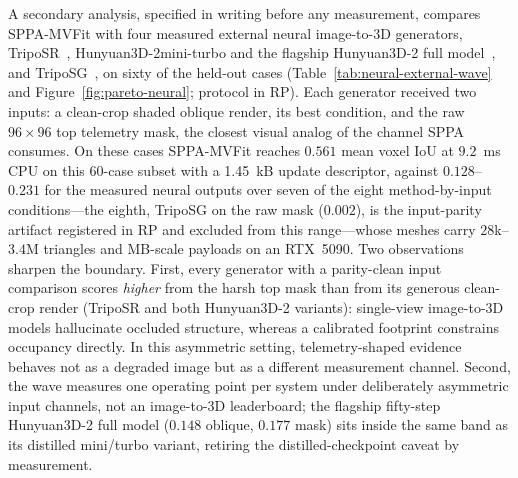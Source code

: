 \documentclass[11pt,a4paper]{article}
\begin{document}
A secondary analysis, specified in writing before any measurement, compares
SPPA-MVFit with four measured external neural image-to-3D generators,
TripoSR~\cite{tochilkin2024triposr}, Hunyuan3D-2mini-turbo and the flagship
Hunyuan3D-2 full model~\cite{zhao2025hunyuan3d}, and
TripoSG~\cite{triposg2025}, on sixty of the held-out cases
(Table~\ref{tab:neural-external-wave} and
Figure~\ref{fig:pareto-neural}; protocol in RP). Each generator received two inputs: a clean-crop shaded oblique
render, its best condition, and the raw \(96\times96\) top telemetry mask, the
closest visual analog of the channel SPPA consumes. On these cases SPPA-MVFit
reaches \(0.561\) mean voxel IoU at \(9.2\)~ms CPU on this 60-case subset
with a 1.45~kB update
descriptor, against \(0.128\)--\(0.231\) for the measured neural outputs over
seven of the eight method-by-input conditions---the eighth, TripoSG on the raw
mask (\(0.002\)), is the input-parity artifact registered in RP and excluded from this
range---whose meshes carry \(28\)k--\(3.4\)M
triangles and MB-scale payloads on an
RTX~5090. Two observations sharpen the boundary. First, every generator with a
parity-clean input comparison scores
\emph{higher} from the harsh top mask than from its generous clean-crop
render (TripoSR and both Hunyuan3D-2 variants): single-view image-to-3D
models hallucinate occluded structure, whereas
a calibrated footprint constrains occupancy directly. In this asymmetric
setting, telemetry-shaped evidence behaves not as a degraded image but as a
different measurement channel. Second,
the wave measures one operating point per system under deliberately asymmetric
input channels, not an image-to-3D leaderboard; the flagship fifty-step
Hunyuan3D-2 full model (\(0.148\) oblique, \(0.177\) mask) sits inside the
same band as its distilled mini/turbo variant, retiring the
distilled-checkpoint caveat by measurement.

\begin{table}[H]
\centering
\scriptsize
\setlength{\tabcolsep}{3pt}
\renewcommand{\arraystretch}{1.0}
\caption{Measured external neural wave (secondary, post-hoc; restored to the
main text in the 2026-07-21 readability pass). Mean voxel IoU at \(64^3\) on
the same sixty held-out cases (Hunyuan3D-2mini-turbo (a): \(n{=}58\) after the
two reported hard crashes), with parenthesized paired \(\Delta\)IoU versus
SPPA-MVFit. Triangles and payload are mesh-output means; generation time is
warm per-case wall time on the same RTX~5090; VRAM is uncapped peak CUDA
allocation. SPPA rows are CPU-only and their payload is the update descriptor,
not a mesh. TripoSG (b) is the input-parity artifact of the
wave protocol (registered in RP). Per-case values:
\texttt{benchmarks/results/sppa\_neural\_flagship\_wave.json}.}
\label{tab:neural-external-wave}
\resizebox{\linewidth}{!}{}
\end{table}
\end{document}
